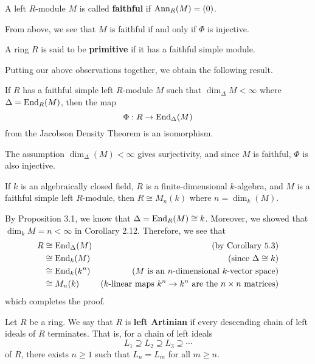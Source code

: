 \begin{defn}{}
A left $R$-module $M$ is called {\bf faithful} if $\operatorname{Ann}_R(M) = (0)$. 
\end{defn}

From above, we see that $M$ is faithful if and only if $\Phi$ is injective. 

\begin{defn}{}
A ring $R$ is said to be {\bf primitive} if it has a faithful simple module.
\end{defn}

Putting our above observations together, we obtain the following result. 

\begin{cor}{}
If $R$ has a faithful simple left $R$-module $M$ such that $\dim_\Delta M < \infty$ where 
$\Delta = \operatorname{End}_R(M)$, then the map 
\[ \Phi : R \to \operatorname{End}_\Delta(M) \]
from the Jacobson Density Theorem is an isomorphism. 
\end{cor}
\begin{pf}
The assumption $\dim_\Delta(M) < \infty$ gives surjectivity, and since $M$ is faithful, 
$\Phi$ is also injective.
\end{pf}

\begin{cor}{}
If $k$ is an algebraically closed field, $R$ is a finite-dimensional $k$-algebra, and $M$ is a 
faithful simple left $R$-module, then $R \cong M_n(k)$ where $n = \dim_k(M)$. 
\end{cor}
\begin{pf}
By Proposition 3.1, we know that $\Delta = \operatorname{End}_R(M) \cong k$. Moreover, we showed that 
$\dim_k M = n < \infty$ in Corollary 2.12. Therefore, we see that 
\begin{align*}
    R &\cong \operatorname{End}_\Delta(M) & \text{(by Corollary 5.3)} \\
    &\cong \operatorname{End}_k(M) & \text{(since $\Delta \cong k$)} \\
    &\cong \operatorname{End}_k(k^n) & \text{($M$ is an $n$-dimensional $k$-vector space)} \\
    &\cong M_n(k) & \text{($k$-linear maps $k^n \to k^n$ are the $n \times n$ matrices)} 
\end{align*}
which completes the proof.
\end{pf}

\begin{defn}{}
Let $R$ be a ring. We say that $R$ is {\bf left Artinian} if every descending chain of left ideals of $R$
terminates. That is, for a chain of left ideals 
\[ L_1 \supseteq L_2 \supseteq L_3 \supseteq \cdots \]
of $R$, there exists $n \geq 1$ such that $L_n = L_m$ for all $m \geq n$. 
\end{defn}

